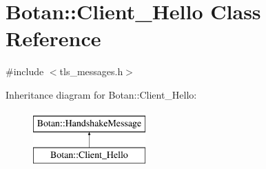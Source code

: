 \hypertarget{classBotan_1_1Client__Hello}{\section{Botan\-:\-:Client\-\_\-\-Hello Class Reference}
\label{classBotan_1_1Client__Hello}
}


{\ttfamily \#include $<$tls\-\_\-messages.\-h$>$}

Inheritance diagram for Botan\-:\-:Client\-\_\-\-Hello\-:\begin{figure}[H]
\begin{center}
\leavevmode
\includegraphics[height=2.000000cm]{classBotan_1_1Client__Hello}
\end{center}
\end{figure}
